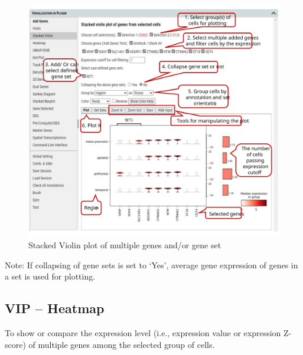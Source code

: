\documentclass[
]{article}
\begin{document}
\begin{figure}
\centering
\includegraphics{figures/F8_label.svg}
\caption{Stacked Violin plot of multiple genes and/or gene set}
\end{figure}

Note: If collapsing of gene sets is set to `Yes', average gene expression of genes in a set is used for plotting.

\hypertarget{vip-heatmap}{%
\subsection{VIP -- Heatmap}\label{vip-heatmap}}

To show or compare the expression level (i.e., expression value or expression Z-score) of multiple genes among the selected group of cells.
\end{document}

